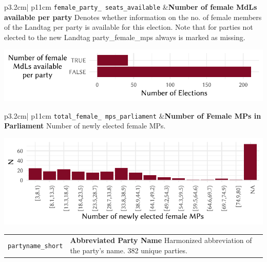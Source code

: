 \documentclass[
]{scrartcl}
\begin{document}
\begin{longtable}{p{3.2cm}| p{11cm}}
\texttt{female\_party\_
seats\_available} &\textbf{Number of female MdLs available per party}\newline 
Denotes whether information on the no. of female members of the Landtag per party is available for this election. Note that for parties not elected to the new Landtag party\_female\_mps always is marked as missing.

\hspace*{.25cm}
\begin{minipage}[t]{\linewidth }
\vspace{0pt}
\includegraphics[width = \linewidth]{cbfiles/fpsaplot.pdf}
\end{minipage}


\end{longtable}

\begin{longtable}{p{3.2cm}| p{11cm}}
\texttt{total\_female\_
mps\_parliament} &\textbf{Number of Female MPs in Parliament}\newline 
Number of newly elected female MPs.

\hspace*{.25cm}
\begin{minipage}[t]{\linewidth }
\vspace{0pt}
\includegraphics[width = \linewidth]{cbfiles/totfemmpsplot.pdf}
\end{minipage}


\end{longtable}

\begin{longtable}{p{3.2cm}| p{11cm}}
\texttt{partyname\_short} &\textbf{Abbreviated Party Name}\newline 
Harmonized abbreviation of the party's name. 382 unique parties.
\end{longtable}
\end{document}
